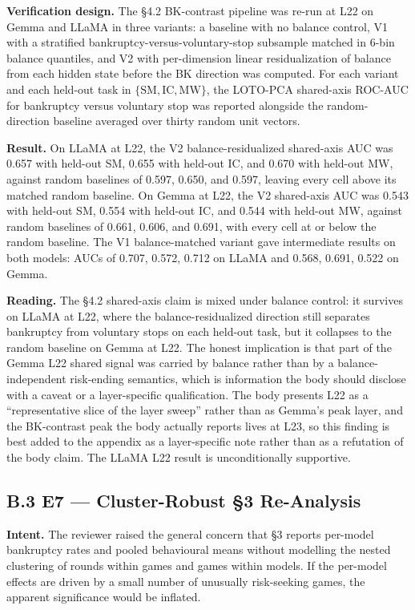 \documentclass[11pt,a4paper]{article}
\begin{document}
\textbf{Verification design.} The \S4.2 BK-contrast pipeline was re-run at L22 on Gemma and LLaMA in three variants: a baseline with no balance control, V1 with a stratified bankruptcy-versus-voluntary-stop subsample matched in 6-bin balance quantiles, and V2 with per-dimension linear residualization of balance from each hidden state before the BK direction was computed. For each variant and each held-out task in $\{\text{SM}, \text{IC}, \text{MW}\}$, the LOTO-PCA shared-axis ROC-AUC for bankruptcy versus voluntary stop was reported alongside the random-direction baseline averaged over thirty random unit vectors.

\textbf{Result.} On LLaMA at L22, the V2 balance-residualized shared-axis AUC was 0.657 with held-out SM, 0.655 with held-out IC, and 0.670 with held-out MW, against random baselines of 0.597, 0.650, and 0.597, leaving every cell above its matched random baseline. On Gemma at L22, the V2 shared-axis AUC was 0.543 with held-out SM, 0.554 with held-out IC, and 0.544 with held-out MW, against random baselines of 0.661, 0.606, and 0.691, with every cell at or below the random baseline. The V1 balance-matched variant gave intermediate results on both models: AUCs of 0.707, 0.572, 0.712 on LLaMA and 0.568, 0.691, 0.522 on Gemma.

\textbf{Reading.} The \S4.2 shared-axis claim is mixed under balance control: it survives on LLaMA at L22, where the balance-residualized direction still separates bankruptcy from voluntary stops on each held-out task, but it collapses to the random baseline on Gemma at L22. The honest implication is that part of the Gemma L22 shared signal was carried by balance rather than by a balance-independent risk-ending semantics, which is information the body should disclose with a caveat or a layer-specific qualification. The body presents L22 as a ``representative slice of the layer sweep'' rather than as Gemma's peak layer, and the BK-contrast peak the body actually reports lives at L23, so this finding is best added to the appendix as a layer-specific note rather than as a refutation of the body claim. The LLaMA L22 result is unconditionally supportive.

\subsection*{B.3 E7 --- Cluster-Robust \S3 Re-Analysis}

\textbf{Intent.} The reviewer raised the general concern that \S3 reports per-model bankruptcy rates and pooled behavioural means without modelling the nested clustering of rounds within games and games within models. If the per-model effects are driven by a small number of unusually risk-seeking games, the apparent significance would be inflated.
\end{document}
